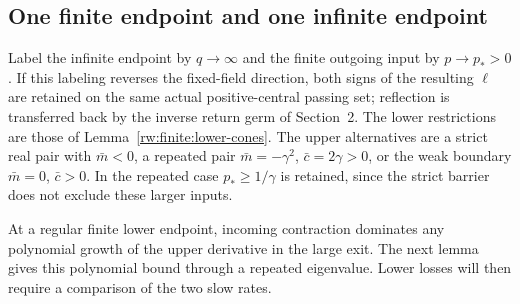 \subsection{One finite endpoint and one infinite endpoint}
\label{rw:infinity:one-finite-section}

Label the infinite endpoint by $q\to\infty$ and the finite
outgoing input by $p\to p_*>0$.
If this labeling reverses the fixed-field direction, both signs of
the resulting
$\ell$ are retained on the same actual positive-central passing set;
reflection is transferred back by the inverse return germ of Section~2.
The lower restrictions are those of
Lemma~\ref{rw:finite:lower-cones}. The upper alternatives are a
strict real pair with $\bar m<0$, a repeated pair
$\bar m=-\gamma^2$, $\bar c=2\gamma>0$, or the weak boundary
$\bar m=0$, $\bar c>0$. In the repeated case $p_*\ge1/\gamma$
is retained, since the strict barrier does not exclude these larger
inputs.

At a regular finite lower endpoint, incoming contraction dominates
any polynomial growth of the upper derivative in the large exit.
The next lemma gives this polynomial bound through a repeated
eigenvalue. Lower losses will then require a comparison of the two
slow rates.

